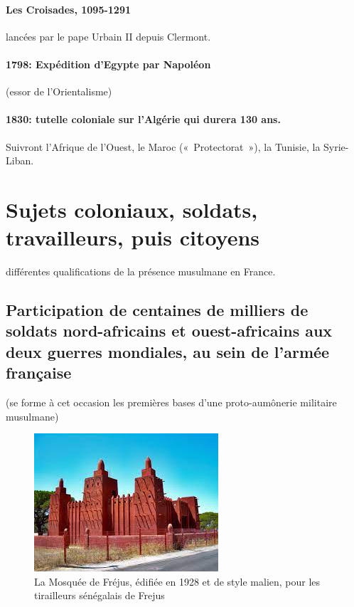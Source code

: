 \paragraph{Les Croisades, 1095-1291}
lancées par le pape Urbain II depuis Clermont.

\paragraph{1798: Expédition d’Egypte par Napoléon}
(essor de l’Orientalisme)

\paragraph{1830: tutelle coloniale sur l’Algérie qui durera 130 ans.}
Suivront l’Afrique de l’Ouest, le Maroc (« Protectorat »), la Tunisie, la Syrie-Liban.


\section{Sujets coloniaux, soldats, travailleurs, puis citoyens}

différentes qualifications de la présence musulmane en France.

\subsection{Participation de centaines de milliers de soldats nord-africains et ouest-africains aux deux guerres mondiales, au sein de l’armée française}

(se forme à cet occasion les premières bases d’une proto-aumônerie militaire musulmane)
\begin{figure}
    \centering
    \includegraphics[width=\textwidth]{Images/MosqueeFrejus.jpg}
    \caption{La Mosquée de Fréjus, édifiée en 1928 et de style malien, pour les tirailleurs sénégalais de Frejus}
    \label{fig:Frejus}
\end{figure}
